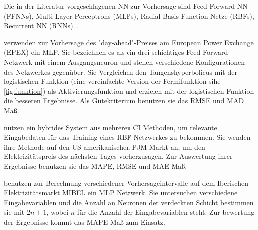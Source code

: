
Die in der Literatur vorgeschlagenen NN zur Vorhersage sind Feed-Forward NN (FFNNs), Multi-Layer Perceptrons (MLPs), Radial Basis Function Netze (RBFs), Recurrent NN (RNNs)...






\citet{Keles2016} verwenden zur Vorhersage des "day-ahead"\--Preises am European Power Exchange (EPEX) ein MLP. Sie bezeichnen es als ein drei schichtiges Feed-Forward Netzwerk mit einem Ausgangsneuron und stellen verschiedene Konfigurationen des Netzwerkes gegenüber. Sie Vergleichen den Tangenshyperbolicus mit der logistischen Funktion (eine vereinfachte Version der Fermifunktion sihe \autoref{fig:funktion}) als Aktivierungsfunktion und erzielen mit der logistischen Funktion die besseren Ergebnisse. Als Gütekriterium benutzen sie das RMSE und MAD Maß.


\citet{Jiang2016} nutzen ein hybrides System aus mehreren CI Methoden, um relevante Eingabedaten für das Training eines RBF Netzwerkes zu bekommen. Sie wenden ihre Methode auf den US amerikanischen PJM-Markt an, um den Elektrizitätspreis des nächsten Tages vorherzusagen. Zur Auswertung ihrer Ergebnisse benutzen sie das MAPE, RMSE und MAE Maß.

\citet{Monteiro2016} benutzen zur Berechnung verschiedener Vorhersageintervalle auf dem Iberischen Elektrizitätsmarkt MIBEL ein MLP Netzwerk. Sie untersuchen verschiedene Eingabevariablen und die Anzahl an Neuronen der verdeckten Schicht bestimmen sie mit $2n+1$, wobei $n$ für die Anzahl der Eingabevariablen steht. Zur bewertung der Ergebnisse kommt das MAPE Maß zum Einsatz.

